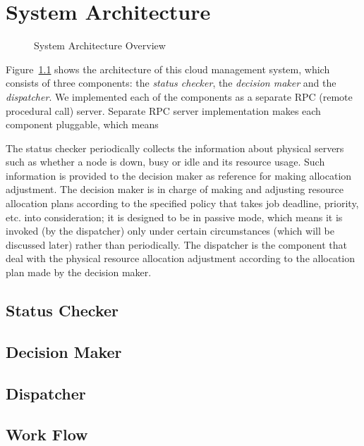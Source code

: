 \chapter{System Architecture}

\begin{figure}
  \centering
  
  \caption{System Architecture Overview}
  \label{fig:archi-overview}
\end{figure}

Figure~\ref{fig:archi-overview} shows the architecture of this cloud
management system, which consists of three components: the \emph{status
checker}, the \emph{decision maker} and the \emph{dispatcher}.  We
implemented each of the components as a separate RPC (remote procedural
call) server.  Separate RPC server implementation makes each component
pluggable, which means







The status checker periodically collects the information about physical
servers such as whether a node is down, busy or idle and its resource
usage.  Such information is provided to the decision maker as reference
for making allocation adjustment.  The decision maker is in charge of
making and adjusting resource allocation plans according to the
specified policy that takes job deadline, priority, etc. into
consideration; it is designed to be in passive mode, which means it is
invoked (by the dispatcher) only under certain circumstances (which will
be discussed later) rather than periodically.  The dispatcher is the
component that deal with the physical resource allocation adjustment
according to the allocation plan made by the decision maker.

\section{Status Checker}

\section{Decision Maker}

\section{Dispatcher}

\section{Work Flow}

